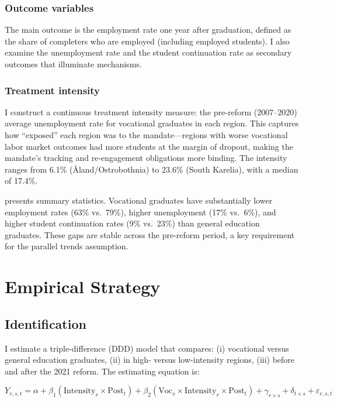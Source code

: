 \documentclass[12pt]{article}
\begin{document}
\subsubsection*{Outcome variables} The main outcome is the employment rate one year after graduation, defined as the share of completers who are employed (including employed students). I also examine the unemployment rate and the student continuation rate as secondary outcomes that illuminate mechanisms.

\subsubsection*{Treatment intensity} I construct a continuous treatment intensity measure: the pre-reform (2007--2020) average unemployment rate for vocational graduates in each region. This captures how ``exposed'' each region was to the mandate---regions with worse vocational labor market outcomes had more students at the margin of dropout, making the mandate's tracking and re-engagement obligations more binding. The intensity ranges from 6.1\% (\r{A}land/Ostrobothnia) to 23.6\% (South Karelia), with a median of 17.4\%.



 presents summary statistics. Vocational graduates have substantially lower employment rates (63\% vs.\ 79\%), higher unemployment (17\% vs.\ 6\%), and higher student continuation rates (9\% vs.\ 23\%) than general education graduates. These gaps are stable across the pre-reform period, a key requirement for the parallel trends assumption.

\section{Empirical Strategy}

\subsection{Identification}

I estimate a triple-difference (DDD) model that compares: (i) vocational versus general education graduates, (ii) in high- versus low-intensity regions, (iii) before and after the 2021 reform. The estimating equation is:

\begin{equation}
Y_{r,s,t} = \alpha + \beta_1 (\text{Intensity}_r \times \text{Post}_t) + \beta_2 (\text{Voc}_s \times \text{Intensity}_r \times \text{Post}_t) + \gamma_{r \times s} + \delta_{t \times s} + \varepsilon_{r,s,t}
\label{eq:ddd}
\end{equation}
\end{document}
